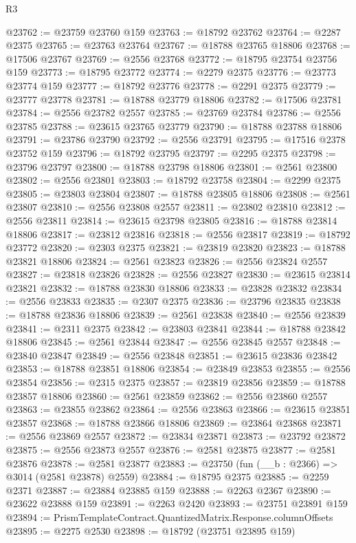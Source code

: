 \begin{lexlean}{R3}
\begin{coremodule}
@23762 := @23759 @23760 @159
@23763 := @18792 @23762
@23764 := @2287 @2375
@23765 := @23763 @23764
@23767 := @18788 @23765 @18806
@23768 := @17506 @23767
@23769 := @2556 @23768
@23772 := @18795 @23754 @23756 @159
@23773 := @18795 @23772
@23774 := @2279 @2375
@23776 := @23773 @23774 @159
@23777 := @18792 @23776
@23778 := @2291 @2375
@23779 := @23777 @23778
@23781 := @18788 @23779 @18806
@23782 := @17506 @23781
@23784 := @2556 @23782 @2557
@23785 := @23769 @23784
@23786 := @2556 @23785
@23788 := @23615 @23765 @23779
@23790 := @18788 @23788 @18806
@23791 := @23786 @23790
@23792 := @2556 @23791
@23795 := @17516 @2378 @23752 @159
@23796 := @18792 @23795
@23797 := @2295 @2375
@23798 := @23796 @23797
@23800 := @18788 @23798 @18806
@23801 := @2561 @23800
@23802 := @2556 @23801
@23803 := @18792 @23758
@23804 := @2299 @2375
@23805 := @23803 @23804
@23807 := @18788 @23805 @18806
@23808 := @2561 @23807
@23810 := @2556 @23808 @2557
@23811 := @23802 @23810
@23812 := @2556 @23811
@23814 := @23615 @23798 @23805
@23816 := @18788 @23814 @18806
@23817 := @23812 @23816
@23818 := @2556 @23817
@23819 := @18792 @23772
@23820 := @2303 @2375
@23821 := @23819 @23820
@23823 := @18788 @23821 @18806
@23824 := @2561 @23823
@23826 := @2556 @23824 @2557
@23827 := @23818 @23826
@23828 := @2556 @23827
@23830 := @23615 @23814 @23821
@23832 := @18788 @23830 @18806
@23833 := @23828 @23832
@23834 := @2556 @23833
@23835 := @2307 @2375
@23836 := @23796 @23835
@23838 := @18788 @23836 @18806
@23839 := @2561 @23838
@23840 := @2556 @23839
@23841 := @2311 @2375
@23842 := @23803 @23841
@23844 := @18788 @23842 @18806
@23845 := @2561 @23844
@23847 := @2556 @23845 @2557
@23848 := @23840 @23847
@23849 := @2556 @23848
@23851 := @23615 @23836 @23842
@23853 := @18788 @23851 @18806
@23854 := @23849 @23853
@23855 := @2556 @23854
@23856 := @2315 @2375
@23857 := @23819 @23856
@23859 := @18788 @23857 @18806
@23860 := @2561 @23859
@23862 := @2556 @23860 @2557
@23863 := @23855 @23862
@23864 := @2556 @23863
@23866 := @23615 @23851 @23857
@23868 := @18788 @23866 @18806
@23869 := @23864 @23868
@23871 := @2556 @23869 @2557
@23872 := @23834 @23871
@23873 := @23792 @23872
@23875 := @2556 @23873 @2557
@23876 := @2581 @23875
@23877 := @2581 @23876
@23878 := @2581 @23877
@23883 := @23750 (fun (__b : @2366) => @3014 (@2581 @23878) @2559)
@23884 := @18795 @2375
@23885 := @2259 @2371
@23887 := @23884 @23885 @159
@23888 := @2263 @2367
@23890 := @23622 @23888 @159
@23891 := @2263 @2420
@23893 := @23751 @23891 @159
@23894 := PrismTemplateContract.QuantizedMatrix.Response.columnOffsets
@23895 := @2275 @2530
@23898 := @18792 (@23751 @23895 @159)

\end{coremodule}
\end{lexlean}
